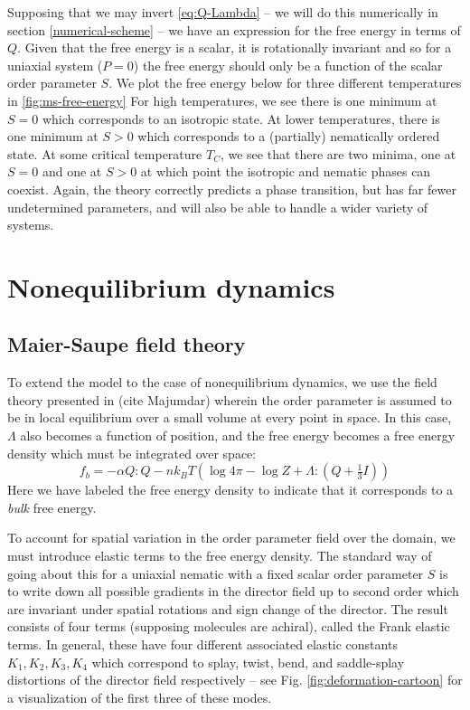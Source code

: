 \documentclass[reqno]{article}
\begin{document}
  Supposing that we may invert \eqref{eq:Q-Lambda} -- we will do this
  numerically in section \ref{numerical-scheme} -- we have an expression for the
  free energy in terms of $Q$.
  Given that the free energy is a scalar, it is rotationally invariant and so
  for a uniaxial system ($P = 0$) the free energy should only be a function of
  the scalar order parameter $S$.
  We plot the free energy below for three different temperatures in \ref{fig:ms-free-energy}
  For high temperatures, we see there is one minimum at $S = 0$ which
  corresponds to an isotropic state.
  At lower temperatures, there is one minimum at $S > 0$ which corresponds to a
  (partially) nematically ordered state.
  At some critical temperature $T_C$, we see that there are two minima, one at
  $S = 0$ and one at $S > 0$ at which point the isotropic and nematic phases can
  coexist.
  Again, the theory correctly predicts a phase transition, but has far fewer
  undetermined parameters, and will also be able to handle a wider variety of systems.

  \section{Nonequilibrium dynamics} \label{nonequilibrium-dynamics}

  \subsection{Maier-Saupe field theory}
  To extend the model to the case of nonequilibrium dynamics, we use the field
  theory presented in (cite Majumdar) wherein the order parameter is assumed to
  be in local equilibrium over a small volume at every point in space.
  In this case, $\Lambda$ also becomes a function of position, and the free
  energy becomes a free energy density which must be integrated over space:
  \begin{equation}
    f_b
    =
    -\alpha Q : Q
    - n k_B T \left(\log 4 \pi - \log Z + \Lambda : \left(Q + \tfrac13 I \right) \right)
  \end{equation}
  Here we have labeled the free energy density to indicate that it corresponds
  to a \textit{bulk} free energy.
  
  To account for spatial variation in the order parameter field over the domain,
  we must introduce elastic terms to the free energy density.
  The standard way of going about this for a uniaxial nematic with a fixed
  scalar order parameter $S$ is to write down all possible gradients in the
  director field up to second order which are invariant under spatial rotations
  and sign change of the director.
  The result consists of four terms (supposing molecules are achiral), called
  the Frank elastic terms.
  In general, these have four different associated elastic constants $K_1, K_2,
  K_3, K_4$ which correspond to splay, twist, bend, and saddle-splay distortions of the
  director field respectively -- see Fig. \ref{fig:deformation-cartoon} for a visualization of the first
  three of these modes.
  
\end{document}
